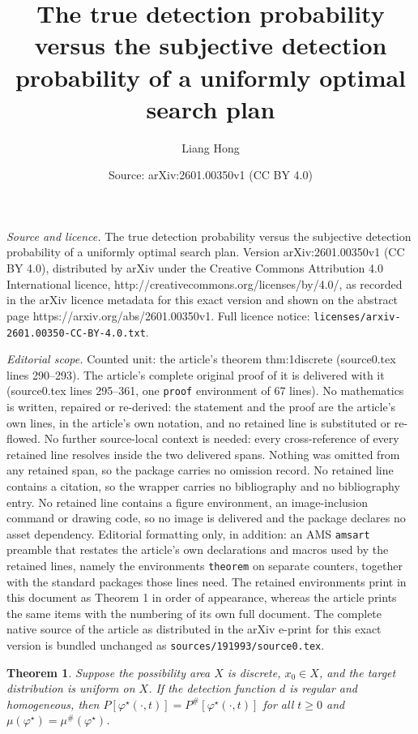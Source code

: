 \documentclass[10pt,a4paper]{amsart}
\title{The true detection probability versus the subjective detection probability of a uniformly optimal search plan}
\author{Liang Hong}
\date{Source: arXiv:2601.00350v1 (CC BY 4.0)}
\newtheorem{theorem}{Theorem}
\begin{document}
\maketitle

\noindent\emph{Source and licence.} The true detection probability versus the subjective detection probability of a uniformly optimal search plan. Version arXiv:2601.00350v1 (CC BY 4.0), distributed by arXiv under the Creative Commons Attribution 4.0 International licence, http://creativecommons.org/licenses/by/4.0/, as recorded in the arXiv licence metadata for this exact version and shown on the abstract page https://arxiv.org/abs/2601.00350v1. Full licence notice: \texttt{licenses/arxiv-2601.00350-CC-BY-4.0.txt}.\par\smallskip

\noindent\textit{Editorial scope.} Counted unit: the article's theorem thm:1discrete (source0.tex lines 290--293). The article's complete original proof of it is delivered with it (source0.tex lines 295--361, one \texttt{proof} environment of 67 lines). No mathematics is written, repaired or re-derived: the statement and the proof are the article's own lines, in the article's own notation, and no retained line is substituted or re-flowed.  No further source-local context is needed: every cross-reference of every retained line resolves inside the two delivered spans.  Nothing was omitted from any retained span, so the package carries no omission record.  No retained line contains a citation, so the wrapper carries no bibliography and no bibliography entry.  No retained line contains a figure environment, an image-inclusion command or drawing code, so no image is delivered and the package declares no asset dependency.  Editorial formatting only, in addition: an AMS \texttt{amsart} preamble that restates the article's own declarations and macros used by the retained lines, namely the environments \texttt{theorem} on separate counters, together with the standard packages those lines need.  The retained environments print in this document as Theorem 1 in order of appearance, whereas the article prints the same items with the numbering of its own full document.  The complete native source of the article as distributed in the arXiv e-print for this exact version is bundled unchanged as \texttt{sources/191993/source0.tex}.
\begin{theorem}
\label{thm:1discrete}
Suppose the possibility area $X$ is discrete, $x_0\in X$,  and the target distribution is uniform on $X$.  If the detection function $d$ is regular and homogeneous, then $P[\varphi^\star(\cdot, t)]=P^{\#}[\varphi^\star(\cdot, t)]$ for all $t\geq 0$ and $\mu(\varphi^\star)=\mu^{\#}(\varphi^\star)$.
\end{theorem}
\end{document}
